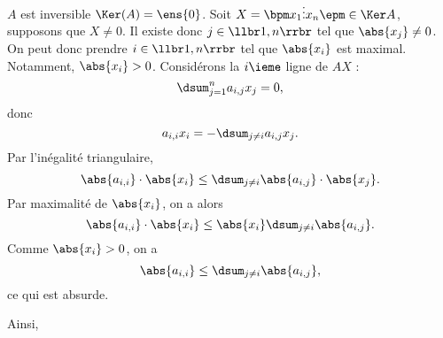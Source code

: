 $A$ est inversible \ssi{} $\Ker(A) =  \ens{0}$. Soit $X  = \bpm x_1 \\ \vdots \\ x_n \epm \in \Ker A$, supposons que $X \neq 0$. 
    Il existe donc $j \in \llbr 1,n \rrbr$ tel que $\abs{x_j} \neq 0$. 
    On peut donc prendre $i \in \llbr 1,n \rrbr$ tel que $\abs{x_i}$ est maximal. 
    Notamment, $\abs{x_i} >0$. 
    Considérons la $i\ieme$ ligne de $AX$ : 
    \begin{equation*}
      \dsum_{j=1}^n a_{i,j} x_j = 0,
    \end{equation*}
    donc 
    \begin{equation*}
      a_{i,i} x_i = - \dsum_{j\neq i} a_{i,j} x_j. 
    \end{equation*}
    Par l'inégalité triangulaire, 
    \begin{equation*}
      \abs{a_{i,i}} \cdot \abs{x_i} \leq \dsum_{j\neq i} \abs{a_{i,j}} \cdot \abs{x_j}. 
    \end{equation*}
    Par maximalité de $\abs{x_i}$, on a alors 
    \begin{equation*}
       \abs{a_{i,i}} \cdot \abs{x_i} \leq  \abs{x_i} \dsum_{j\neq i} \abs{a_{i,j}}. 
    \end{equation*}
    Comme $ \abs{x_i}>0$, on a 
    \begin{equation*}
      \abs{a_{i,i}} \leq \dsum_{j\neq i} \abs{a_{i,j}},
    \end{equation*}
    ce qui est absurde. 
    
    Ainsi, 
